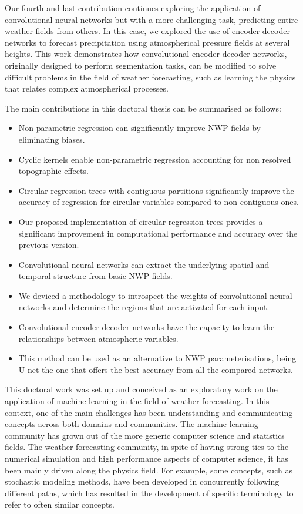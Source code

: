 \medskip

Our fourth and last contribution continues exploring the application of convolutional neural networks but with a more challenging task, predicting entire weather fields from  others. In this case, we explored the use of encoder-decoder networks to forecast precipitation using atmospherical pressure fields at several heights. This work demonstrates how convolutional encoder-decoder networks, originally designed to perform segmentation tasks, can be modified to solve difficult problems in the field of weather forecasting, such as learning the physics that relates complex atmospherical processes.

\bigskip
\bigskip
\bigskip

The main contributions in this doctoral thesis can be summarised as follows:

\begin{itemize}
  \item Non-parametric regression can significantly improve NWP fields by eliminating biases.
  \item Cyclic kernels enable non-parametric regression accounting for non resolved topographic effects.
  \item Circular regression trees with contiguous partitions significantly improve the accuracy of regression for circular variables compared to non-contiguous ones.
  \item Our proposed implementation of circular regression trees provides a significant improvement in computational performance and accuracy over the previous version.
  \item Convolutional neural networks can extract the underlying spatial and temporal structure from basic NWP fields.
  \item We deviced a methodology to introspect the weights of convolutional neural networks and determine the regions that are activated for each input.
  \item Convolutional encoder-decoder networks have the capacity to learn the relationships between atmospheric variables. 
  \item This method can be used as an alternative to NWP parameterisations, being U-net the one that offers the best accuracy from all the compared networks.
\end{itemize}

\medskip

This doctoral work was set up and conceived as an exploratory work on the application of machine learning in the field of weather forecasting. In this context, one of the main challenges has been understanding and communicating concepts across both domains and communities. The machine learning community has grown out of the more generic computer science and statistics fields. The weather forecasting community, in spite of having strong ties to the numerical simulation and high performance aspects of computer science, it has been mainly driven along the physics field. For example, some concepts, such as stochastic modeling methods, have been developed in concurrently following different paths, which has resulted in the development of specific terminology to refer to often similar concepts.

